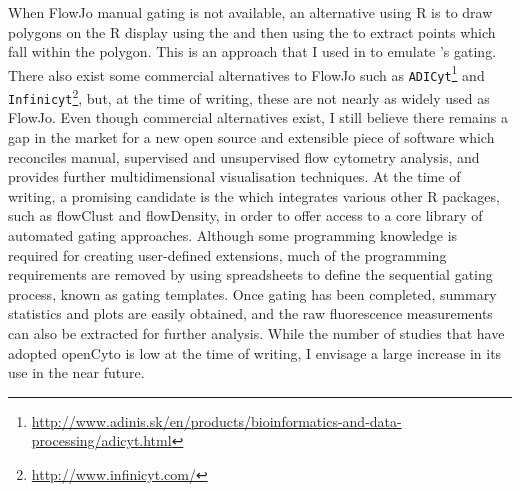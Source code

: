 When FlowJo manual gating is not available, an alternative using R is to draw polygons on the R display using the  and then using the  to extract points which fall within the polygon.
This is an approach that I used in  to emulate 's gating.
There also exist some commercial alternatives to FlowJo  such as \texttt{ADICyt}\footnote{\url{http://www.adinis.sk/en/products/bioinformatics-and-data-processing/adicyt.html}} and \texttt{Infinicyt}\footnote{\url{http://www.infinicyt.com/}}, but, at the time of writing, these are not nearly as widely used as FlowJo.
Even though commercial alternatives exist, I still believe there remains a gap in the market for a new open source and extensible piece of software which reconciles manual, supervised and unsupervised flow cytometry analysis, and provides further multidimensional visualisation techniques.
At the time of writing, a promising candidate is the  which integrates various other R packages, such as \textsf{flowClust} and \textsf{flowDensity}, in order to offer access to a core library of automated gating approaches.
Although some programming knowledge is required for creating user-defined extensions, much of the programming requirements are removed by using spreadsheets to define the sequential gating process, known as gating templates.
Once gating has been completed, summary statistics and plots are easily obtained, and the raw fluorescence measurements can also be extracted for further analysis.
While the number of studies that have adopted \textsf{openCyto} is low at the time of writing, I envisage a large increase in its use in the near future.

%

